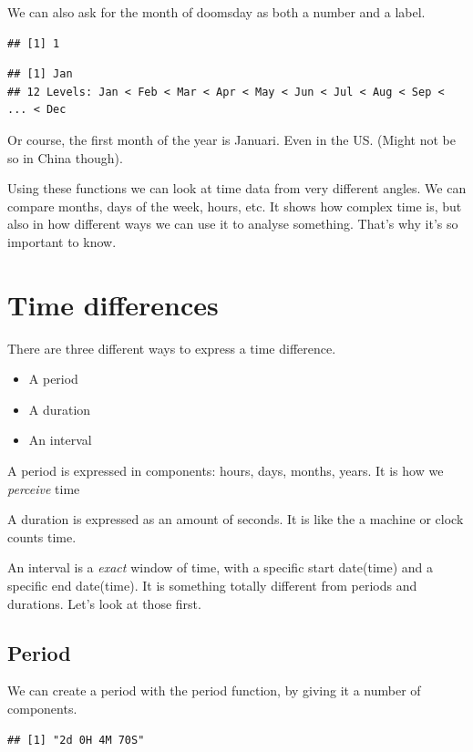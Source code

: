 \documentclass[]{tufte-book}
\providecommand{\tightlist}{%
  \setlength{\itemsep}{0pt}\setlength{\parskip}{0pt}}
\begin{document}
We can also ask for the month of doomsday as both a number and a label.

\begin{verbatim}
## [1] 1
\end{verbatim}

\begin{verbatim}
## [1] Jan
## 12 Levels: Jan < Feb < Mar < Apr < May < Jun < Jul < Aug < Sep < ... < Dec
\end{verbatim}

Or course, the first month of the year is Januari. Even in the US. (Might not be so in China though).

Using these functions we can look at time data from very different angles. We can compare months, days of the week, hours, etc. It shows how complex time is, but also in how different ways we can use it to analyse something. That's why it's so important to know.

\hypertarget{time-differences}{%
\section{Time differences}\label{time-differences}}

There are three different ways to express a time difference.

\begin{itemize}
\tightlist
\item
  A period
\item
  A duration
\item
  An interval
\end{itemize}

A period is expressed in components: hours, days, months, years. It is how we \emph{perceive} time

A duration is expressed as an amount of seconds. It is like the a machine or clock counts time.

An interval is a \emph{exact} window of time, with a specific start date(time) and a specific end date(time). It is something totally different from periods and durations. Let's look at those first.

\hypertarget{period-1}{%
\subsection{Period}\label{period-1}}

We can create a period with the period function, by giving it a number of components.

\begin{verbatim}
## [1] "2d 0H 4M 70S"
\end{verbatim}
\end{document}
